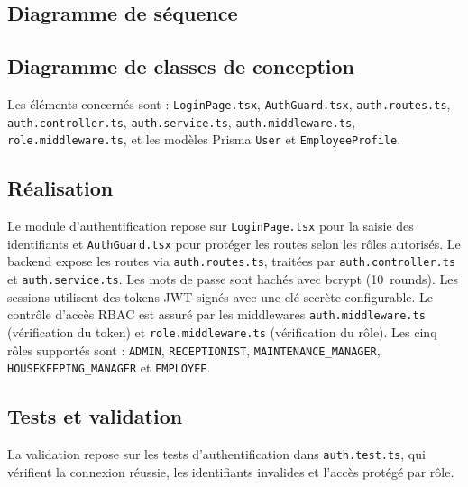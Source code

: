 \subsection{Diagramme de séquence}

\subsection{Diagramme de classes de conception}
Les éléments concernés sont : \texttt{LoginPage.tsx}, \texttt{AuthGuard.tsx}, \texttt{auth.routes.ts}, \texttt{auth.controller.ts}, \texttt{auth.service.ts}, \texttt{auth.middleware.ts}, \texttt{role.middleware.ts}, et les modèles Prisma \texttt{User} et \texttt{EmployeeProfile}.


\subsection{Réalisation}
Le module d'authentification repose sur \texttt{LoginPage.tsx} pour la saisie des identifiants et \texttt{AuthGuard.tsx} pour protéger les routes selon les rôles autorisés. Le backend expose les routes via \texttt{auth.routes.ts}, traitées par \texttt{auth.controller.ts} et \texttt{auth.service.ts}. Les mots de passe sont hachés avec bcrypt (10~rounds). Les sessions utilisent des tokens JWT signés avec une clé secrète configurable. Le contrôle d'accès RBAC est assuré par les middlewares \texttt{auth.middleware.ts} (vérification du token) et \texttt{role.middleware.ts} (vérification du rôle). Les cinq rôles supportés sont : \texttt{ADMIN}, \texttt{RECEPTIONIST}, \texttt{MAINTENANCE\_MANAGER}, \texttt{HOUSEKEEPING\_MANAGER} et \texttt{EMPLOYEE}.


\subsection{Tests et validation}
La validation repose sur les tests d'authentification dans \texttt{auth.test.ts}, qui vérifient la connexion réussie, les identifiants invalides et l'accès protégé par rôle.

